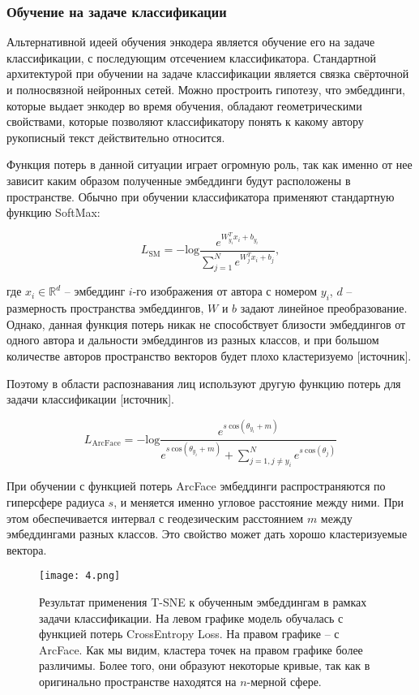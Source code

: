 \subsubsection{Обучение на задаче классификации}

Альтернативной идеей обучения энкодера является обучение его на задаче классификации, с последующим отсечением классификатора. Стандартной архитектурой при обучении на задаче классификации является связка свёрточной и полносвязной нейронных сетей. Можно простроить гипотезу, что эмбеддинги, которые выдает энкодер во время обучения, обладают геометрическими свойствами, которые позволяют классификатору понять к какому автору рукописный текст действительно относится.

Функция потерь в данной ситуации играет огромную роль, так как именно от нее зависит каким образом полученные эмбеддинги будут расположены в пространстве. Обычно при обучении классификатора применяют стандартную функцию SoftMax:

$$
L_{\text{SM}} = -\text{log} \frac{e^{W_{y_i}^T x_i + b_{y_i}}}{\sum_{j=1}^{N} e^{W_{j}^T x_i + b_{j}}},
$$
\smallskip

\noindent
где $x_i \in \mathbb{R}^d$ -- эмбеддинг $i$-го изображения от автора с номером $y_i$, $d$ -- размерность пространства эмбеддингов, $W$ и $b$ задают линейное преобразование. Однако, данная функция потерь никак не способствует близости эмбеддингов от одного автора и дальности эмбеддингов из разных классов, и при большом количестве авторов пространство векторов будет плохо кластеризуемо [источник]. 

Поэтому в области распознавания лиц используют другую функцию потерь для задачи классификации [источник]. 

$$
L_{\text{ArcFace}} = - \text{log} \frac{e^{s\:\text{cos}(\theta_{y_i} + m)}}
{e^{s\:\text{cos}(\theta_{y_i} + m)} + \sum^{N}_{j=1, j \neq y_i} e^{s\:\text{cos}(\theta_j)}}
$$
\smallskip

При обучении с функцией потерь ArcFace эмбеддинги распространяются по гиперсфере радиуса $s$, и меняется именно угловое расстояние между ними. При этом обеспечивается интервал с геодезическим расстоянием $m$ между эмбеддингами разных классов. Это свойство может дать хорошо кластеризуемые вектора.

\begin{figure}[htbp]
    \centering
    \texttt{[image: 4.png]}
    \captionsetup{width=0.9\textwidth}
    \caption{Результат применения T-SNE к обученным эмбеддингам в рамках задачи классификации. На левом графике модель обучалась с функцией потерь CrossEntropy Loss. На правом графике -- с ArcFace. Как мы видим, кластера точек на правом графике более различимы. Более того, они образуют некоторые кривые, так как в оригинально пространстве находятся на $n$-мерной сфере.}
    \label{fig:example}
\end{figure}

